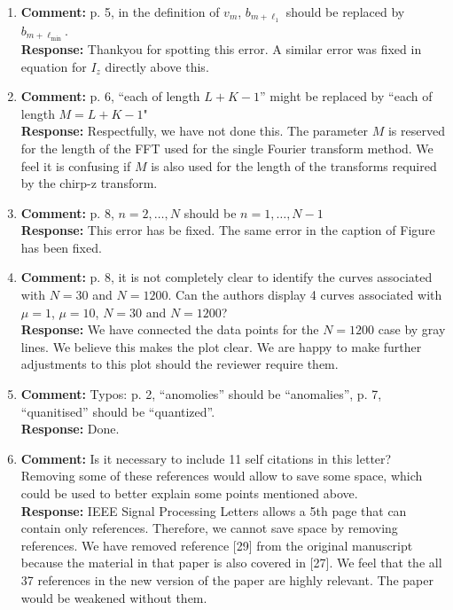 \documentclass[a4paper,10pt]{article}
\begin{document}
\begin{enumerate}
\item\textbf{Comment:}
p. 5, in the definition of $v_m$, $b_{m+\ell_1}$ should be replaced by $b_{m+\ell_{\text{min}}}$.
\\
\textbf{Response:}
Thankyou for spotting this error.  A similar error was fixed in equation for $I_z$ directly above this. 


\item\textbf{Comment:}
p. 6, ``each of length $L+K-1$'' might be replaced by ``each of length $M = L + K - 1$"
\\
\textbf{Response:}
Respectfully, we have not done this.  The parameter $M$ is reserved for the length of the FFT used for the single Fourier transform method.  We feel it is confusing if $M$ is also used for the length of the transforms required by the chirp-z transform.


\item\textbf{Comment:}
p. 8, $n = 2,\dots,N$ should be $n = 1, \dots, N - 1$
\\
\textbf{Response:}
This error has be fixed.  The same error in the caption of Figure~ has been fixed.


\item\textbf{Comment:}
p. 8, it is not completely clear to identify the curves associated with $N = 30$ and $N = 1200$. Can the authors display 4 curves associated with $\mu= 1$, $\mu = 10$, $N = 30$ and $N = 1200$?
\\
\textbf{Response:}
We have connected the data points for the $N=1200$ case by gray lines.  We believe this makes the plot clear.  We are happy to make further adjustments to this plot should the reviewer require them. 

\item\textbf{Comment:}
Typos: p. 2, ``anomolies'' should be ``anomalies'', p. 7, ``quanitised'' should be
``quantized''.
\\
\textbf{Response:}
Done.


\item\textbf{Comment:} 
Is it necessary to include 11 self citations in this letter? Removing some of
these references would allow to save some space, which could be used to better
explain some points mentioned above.
\\
\textbf{Response:}
IEEE Signal Processing Letters allows a 5th page that can contain only references.  Therefore, we cannot save space by removing references.   We have removed reference [29] from the original manuscript because the material in that paper is also covered in [27].  We feel that the all 37 references in the new version of the paper are highly relevant.  The paper would be weakened without them.

\end{enumerate}
\end{document}
